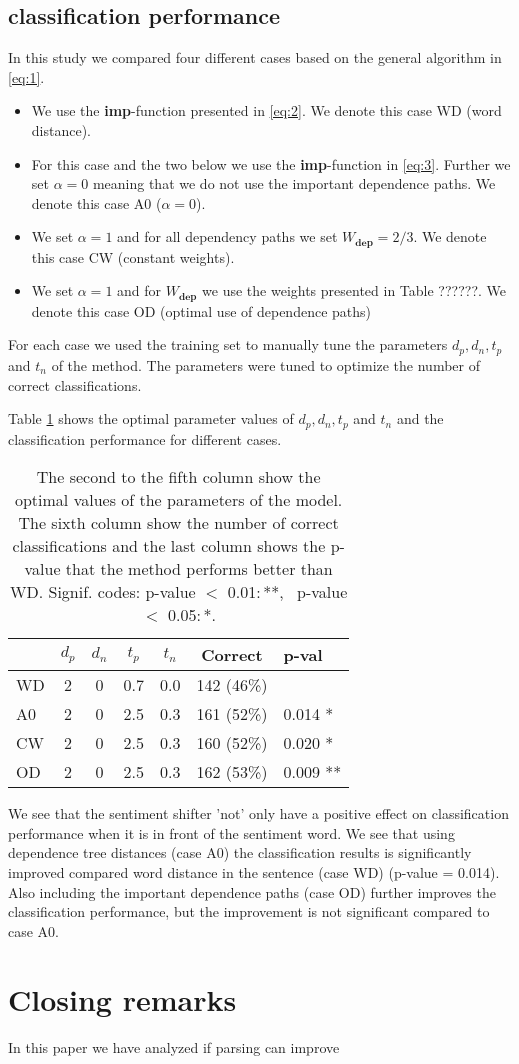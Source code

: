 \documentclass[11pt]{article}
\begin{document}
\subsection{classification performance}

In this study we compared four different cases based on the general algorithm in \eqref{eq:1}.
\begin{itemize}
\item We use the \textbf{imp}-function presented in \eqref{eq:2}. We denote this case WD (word distance).
\item For this case and the two below we use the \textbf{imp}-function in \eqref{eq:3}. Further we set $\alpha = 0$ meaning that we do not use the important dependence paths. We denote this case A0 ($\alpha = 0$).
\item We set $\alpha = 1$ and for all dependency paths we set $W_{\mathbf{dep}} = 2/3$. We denote this case CW (constant weights).
\item We set $\alpha = 1$ and for $W_{\mathbf{dep}}$ we use the weights presented in Table ??????. We denote this case OD (optimal use of dependence paths)
\end{itemize}
For each case we used the training set to manually tune the parameters $d_p, d_n, t_p$ and $t_n$ of the method. The parameters were tuned to optimize the number of correct classifications.

Table \ref{tab:2} shows the optimal parameter values of $d_p, d_n, t_p$ and $t_n$ and the classification performance for different cases. 
\begin{table}
  \centering
  \begin{tabular}{lcccccl}
       & $d_p$ & $d_n$ & $t_p$ & $t_n$ & Correct   & p-val \\ \hline
    WD &    2  &   0  & 0.7  &  0.0  & 142 (46\%) & \\
    A0 &    2  &   0  & 2.5  &  0.3  & 161 (52\%) & 0.014 *\\
    CW &    2  &   0  & 2.5  &  0.3  & 160 (52\%) & 0.020 *\\
    OD &    2  &   0  & 2.5  &  0.3  & 162 (53\%) & 0.009 **
  \end{tabular}
  \caption{The second to the fifth column show the optimal values of the parameters of the model. The sixth column show the number of correct classifications and the last column shows the p-value that the method performs better than WD. Signif. codes: p-value $<$ 0.01:\,**, \, p-value $<$ 0.05:\,*.}
  \label{tab:2}
\end{table}
We see that the sentiment shifter 'not' only have a positive effect on classification performance when it is in front of the sentiment word. We see that using dependence tree distances (case A0) the classification results is significantly improved compared word distance in the sentence (case WD) (p-value = 0.014). Also including the important dependence paths (case OD) further improves the classification performance, but the improvement is not significant compared to case A0.

\section{Closing remarks}
\label{sec:cr}

In this paper we have analyzed if parsing can improve 



\end{document}
